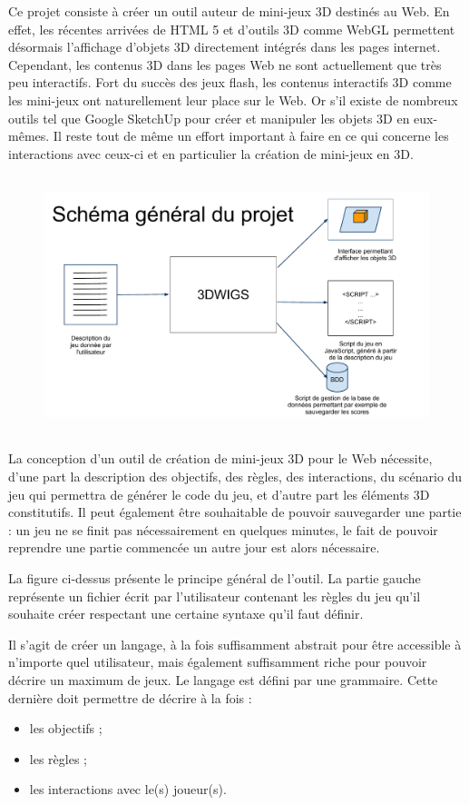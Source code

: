 Ce projet consiste à créer un outil auteur de mini-jeux 3D destinés au Web.
En effet, les récentes arrivées de HTML 5 et d'outils 3D comme WebGL permettent désormais l'affichage d'objets 3D directement
intégrés dans les pages internet.
Cependant, les contenus 3D dans les pages Web ne sont actuellement que très peu interactifs.
Fort du succès des jeux flash, les contenus interactifs 3D comme les mini-jeux ont naturellement leur place sur le Web.
Or s'il existe de nombreux outils tel que Google SketchUp pour créer et manipuler les objets 3D en eux-mêmes.
Il reste tout de même un effort important à faire en ce qui concerne les interactions avec ceux-ci et en particulier la création de mini-jeux en 3D.

\begin{figure}[h]
 \centering
 \includegraphics[height=7.5cm]{img/schema_general}
\end{figure}

La conception d'un outil de création de mini-jeux 3D pour le Web nécessite, d'une part la description des objectifs, des règles, des interactions, 
du scénario du jeu qui permettra de générer le code du jeu, et d'autre part les éléments 3D constitutifs.
Il peut également être souhaitable de pouvoir sauvegarder une partie :
un jeu ne se finit pas nécessairement en quelques minutes, le fait de pouvoir reprendre une partie commencée un autre jour est alors nécessaire.

\vspace{0.2cm}

La figure ci-dessus présente le principe général de l'outil.
La partie gauche représente un fichier écrit par l'utilisateur contenant les règles du jeu qu'il souhaite créer respectant
une certaine syntaxe qu'il faut définir.

Il s'agit de créer un langage, à la fois suffisamment abstrait pour être accessible à n'importe quel utilisateur, mais également suffisamment riche
pour pouvoir décrire un maximum de jeux.
Le langage est défini par une grammaire.
Cette dernière doit permettre de décrire à la fois :
\begin{itemize}
 \item les objectifs ;
 \item les règles ;
 \item les interactions avec le(s) joueur(s).
\end{itemize}

